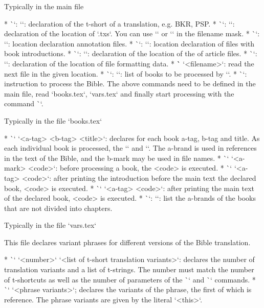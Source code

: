 {{{{\secc Typically in the main file

\begitems
* \`\tmark`: `\def\tmark{<t-short>}`: declaration of the t-short of a translation, e.g. BKR, PSP.
* \`\txsfile`: `\def\txsfile {<filename mask>}`: declaration of the location of `.txs`. 
  You can use `\amark` or `\bmark` in the filename mask. 
* \`\notesfile`: `\def\notesfile {<filename mask>}`: location declaration
   annotation files. 
* \`\introfile`: `\def\introfile {<filename mask>}`: location declaration
   of files with book introductions. 
* \`\articlefile`: `\def\articlefile {<filename mask>}`: declaration of the location of the
   of article files.
* \`\fmtfile`: `\def\fmtfile {<filename mask>}`: declaration of the location of
   file formatting data. 
* \`` `{<filename>}`: read the next file in the given location.
* \`\printedbooks`: `\def\printedbooks {<list of a-bookmarks>}`:
  list of books to be processed by `\processbooks`.
* \`\processbooks`: instruction to process the Bible.
\enditems
The above commands need to be defined in the main file, 
read `books.tex`, `vars.tex` and finally start processing with the command
\`\processboks`.

\secc Typically in the file `books.tex`

\begitems
* \`\BookTitle` `<a-tag> <b-tag> <title>`: declares for each book
  a-tag, b-tag and title. As each individual book is processed, the
  `\def\amark{<a-mark>}` and `\def\bmark{b-mark}`. The a-brand is used in
  references in the text of the Bible, and the b-mark may be used in file names.
* \`\BookException` `<a-mark> {<code>}`: before processing a book, the
  <code> is executed.
* \`\BookPre` `<a-tag> {<code>}`: after printing the introduction before the main text
  the declared book, <code> is executed.
* \`\BookPost` `<a-tag> {<code>}`: after printing the main text
  of the declared book, <code> is executed.
* \`\nochapbooks`: `\def\nochapbooks{<list>}`: list the a-brands of the books that
  are not divided into chapters.
\enditems

\secc Typically in the file `vars.tex`

This file declares variant phrases for different versions of the Bible translation.

\begitems
* \`\variants` `<number>` `<list of t-short translation variants>`: declares the number of
  translation variants and a list of \hbox{t-strings}. The number must match the number of
  t-shortcuts as well as the number of parameters of the \`\vdef` and \`\ww` commands.
* \`\vdef` `<phrase variants>`; declares the variants of the phrase, the first of which is
  reference. The phrase variants are given by the literal `{<this>}`.
\enditems

}}}}

